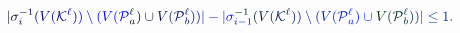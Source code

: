 \documentclass[12pt]{article}
\begin{document}
\makeatletter
\renewcommand*{\@textcolor}[3]{%
  \protect\leavevmode
  \begingroup
    \color#1{#2}#3%
  \endgroup
}
\makeatother
\begin{displaymath}
\mathcolor[RGB]{0,0,15}{|} \mathcolor[RGB]{0,0,30}{\sigma} _ { \mathcolor[RGB]{0,0,45}{i} } ^ { \mathcolor[RGB]{0,0,60}{-} \mathcolor[RGB]{0,0,75}{1} } \mathcolor[RGB]{0,0,90}{(} \mathcolor[RGB]{0,0,105}{V} \mathcolor[RGB]{0,0,120}{(} \mathcal { \mathcolor[RGB]{0,0,135}{K} } ^ { \mathcolor[RGB]{0,0,150}{\ell} } \mathcolor[RGB]{0,0,165}{)} \mathcolor[RGB]{0,0,180}{)} \mathcolor[RGB]{0,0,195}{\setminus} \mathcolor[RGB]{0,0,210}{(} \mathcolor[RGB]{0,0,225}{V} \mathcolor[RGB]{0,0,240}{(} \mathcal { \mathcolor[RGB]{0,0,255}{P} } _ { \mathcolor[RGB]{0,15,0}{a} } ^ { \mathcolor[RGB]{0,15,15}{\ell} } \mathcolor[RGB]{0,15,30}{)} \mathcolor[RGB]{0,15,45}{\cup} \mathcolor[RGB]{0,15,60}{V} \mathcolor[RGB]{0,15,75}{(} \mathcal { \mathcolor[RGB]{0,15,90}{P} } _ { \mathcolor[RGB]{0,15,105}{b} } ^ { \mathcolor[RGB]{0,15,120}{\ell} } \mathcolor[RGB]{0,15,135}{)} \mathcolor[RGB]{0,15,150}{)} \mathcolor[RGB]{0,15,165}{|} \mathcolor[RGB]{0,15,180}{-} \mathcolor[RGB]{0,15,195}{|} \mathcolor[RGB]{0,15,210}{\sigma} _ { \mathcolor[RGB]{0,15,225}{i} \mathcolor[RGB]{0,15,240}{-} \mathcolor[RGB]{0,15,255}{1} } ^ { \mathcolor[RGB]{0,30,0}{-} \mathcolor[RGB]{0,30,15}{1} } \mathcolor[RGB]{0,30,30}{(} \mathcolor[RGB]{0,30,45}{V} \mathcolor[RGB]{0,30,60}{(} \mathcal { \mathcolor[RGB]{0,30,75}{K} } ^ { \mathcolor[RGB]{0,30,90}{\ell} } \mathcolor[RGB]{0,30,105}{)} \mathcolor[RGB]{0,30,120}{)} \mathcolor[RGB]{0,30,135}{\setminus} \mathcolor[RGB]{0,30,150}{(} \mathcolor[RGB]{0,30,165}{V} \mathcolor[RGB]{0,30,180}{(} \mathcal { \mathcolor[RGB]{0,30,195}{P} } _ { \mathcolor[RGB]{0,30,210}{a} } ^ { \mathcolor[RGB]{0,30,225}{\ell} } \mathcolor[RGB]{0,30,240}{)} \mathcolor[RGB]{0,30,255}{\cup} \mathcolor[RGB]{0,45,0}{V} \mathcolor[RGB]{0,45,15}{(} \mathcal { \mathcolor[RGB]{0,45,30}{P} } _ { \mathcolor[RGB]{0,45,45}{b} } ^ { \mathcolor[RGB]{0,45,60}{\ell} } \mathcolor[RGB]{0,45,75}{)} \mathcolor[RGB]{0,45,90}{)} \mathcolor[RGB]{0,45,105}{|} \mathcolor[RGB]{0,45,120}{\leq} \mathcolor[RGB]{0,45,135}{1} \mathcolor[RGB]{0,45,150}{.}
\end{displaymath}
\end{document}
